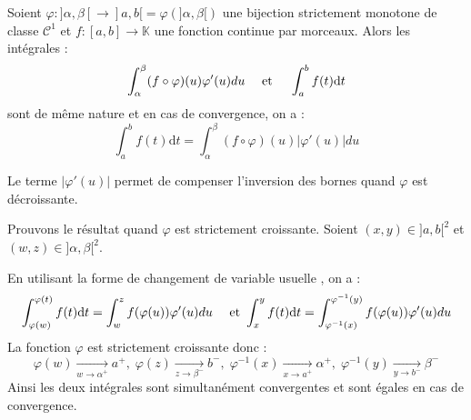 \documentclass[french,11pt,twoside]{VcCours}
\newcommand{\dt}{\text{d}t}
\begin{document}
\begin{Theoreme}{} Soient $\varphi : ]\alpha, \beta[ \rightarrow ]a,b[= \varphi(]\alpha,\beta[)$ une bijection strictement monotone de classe $\mathcal{C}^1$ et $f : [a,b] \rightarrow \mathbb{K}$ une fonction continue par morceaux. Alors les intégrales :
$$  \int_{\alpha}^{\beta} (f \circ \varphi)(u) \varphi'(u) du \quad \hbox{ et } \quad \int_{a}^b f(t) \dt$$
sont de même nature et en cas de convergence, on a :
$$ \int_{a}^b f(t) \dt= \int_{\alpha}^{\beta} (f \circ \varphi)(u) \vert \varphi'(u) \vert du$$
\end{Theoreme}

\begin{Remarque}{} Le terme $\vert \varphi'(u) \vert$ permet de compenser l'inversion des bornes quand $\varphi$ est décroissante.
\end{Remarque}

\begin{Demonstration}{} Prouvons le résultat quand $\varphi$ est strictement croissante. Soient $(x,y) \in ]a,b[^2$ et $(w,z) \in ]\alpha, \beta[^2$. 

En utilisant la forme de changement de variable \og usuelle \fg, on a :
$$ \int_{\varphi(w)}^{\varphi(t)} f(t) \dt = \int_{w}^{z} f (\varphi(u)) \varphi'(u) du \quad \hbox{ et } \int_{x}^{y} f(t) \dt = \int_{\varphi^{-1}(x)}^{\varphi^{-1}(y)} f (\varphi(u)) \varphi'(u) du$$
La fonction $\varphi$ est strictement croissante donc :
$$ \varphi(w) \underset{w \rightarrow \alpha^+}{\rightarrow} a^+, \; \varphi(z) \underset{z \rightarrow \beta^-}{\rightarrow} b^-, \; \varphi^{-1}(x) \underset{x \rightarrow a^+}{\rightarrow} \alpha^+, \; \varphi^{-1}(y) \underset{y \rightarrow b^-}{\rightarrow} \beta^-$$
Ainsi les deux intégrales sont simultanément convergentes et sont égales en cas de convergence.

\end{Demonstration} 

%
\end{document}

